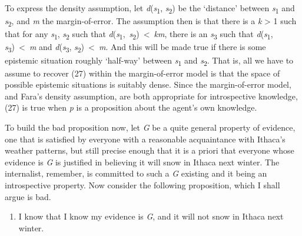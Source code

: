 \documentclass[
  11pt,
  letterpaper,
  DIV=11,
  numbers=noendperiod,
  oneside]{scrartcl}
\providecommand{\tightlist}{%
  \setlength{\itemsep}{0pt}\setlength{\parskip}{0pt}}\usepackage{longtable,booktabs,array}
\begin{document}
To express the density assumption, let
\emph{d}(\emph{s}\textsubscript{1}, \emph{s}\textsubscript{2}) be the
`distance' between \emph{s}\textsubscript{1} and
\emph{s}\textsubscript{2}, and \emph{m} the margin-of-error. The
assumption then is that there is a \emph{k} \textgreater{} 1 such that
for any \emph{s}\textsubscript{1}, \emph{s}\textsubscript{2} such that
\emph{d}(\emph{s}\textsubscript{1},~\emph{s}\textsubscript{2})~\textless~\emph{km},
there is an \emph{s}\textsubscript{3} such that
\emph{d}(\emph{s}\textsubscript{1},
\emph{s}\textsubscript{3})~\textless~\emph{m} and
\emph{d}(\emph{s}\textsubscript{3},
\emph{s}\textsubscript{2})~\textless~\emph{m}. And this will be made
true if there is some epistemic situation roughly `half-way' between
\emph{s}\textsubscript{1} and \emph{s}\textsubscript{2}. That is, all we have to assume to recover
(27) within the margin-of-error model is that the space of possible
epistemic situations is suitably dense. Since the margin-of-error model,
and Fara's density assumption, are both appropriate for introspective
knowledge, (27) is true when \emph{p} is a proposition about the agent's
own knowledge.

To build the bad proposition now, let \emph{G} be a quite general
property of evidence, one that is satisfied by everyone with a
reasonable acquaintance with Ithaca's weather patterns, but still
precise enough that it is a priori that everyone whose evidence is
\emph{G} is justified in believing it will snow in Ithaca next winter.
The internalist, remember, is committed to such a \emph{G} existing and
it being an introspective property. Now consider the following
proposition, which I shall argue is bad.

\begin{enumerate}
\def\labelenumi{\arabic{enumi}.}
\setcounter{enumi}{27}
\tightlist
\item
  I know that I know my evidence is \emph{G}, and it will not snow in
  Ithaca next winter.
\end{enumerate}
\end{document}
